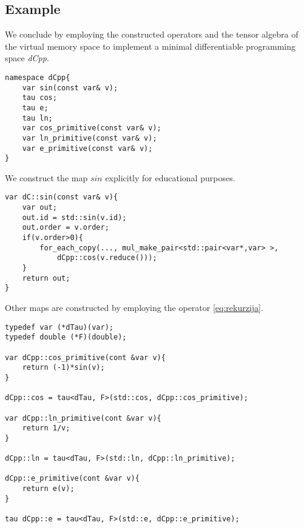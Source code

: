 \subsection{Example}

We conclude by employing the constructed operators and the tensor algebra of the virtual memory space to implement a minimal differentiable programming space \emph{dCpp}.

\begin{lstlisting}
namespace dCpp{
    var sin(const var& v);
    tau cos;
    tau e;
    tau ln;
    var cos_primitive(const var& v);
    var ln_primitive(const var& v);
    var e_primitive(const var& v);
}
\end{lstlisting}

\noindent We construct the map $sin$ explicitly for educational purposes.

\begin{lstlisting}
var dC::sin(const var& v){
    var out;
    out.id = std::sin(v.id);
    out.order = v.order;
    if(v.order>0){
    	for_each_copy(..., mul_make_pair<std::pair<var*,var> >,
    		dCpp::cos(v.reduce()));
    }
    return out;
}
\end{lstlisting}
Other maps are constructed by employing the operator \eqref{eq:rekurzija}.
\begin{lstlisting}
typedef var (*dTau)(var);
typedef double (*F)(double);

var dCpp::cos_primitive(cont &var v){
    return (-1)*sin(v);
}

dCpp::cos = tau<dTau, F>(std::cos, dCpp::cos_primitive);

var dCpp::ln_primitive(cont &var v){
    return 1/v;
}

dCpp::ln = tau<dTau, F>(std::ln, dCpp::ln_primitive);

dCpp::e_primitive(cont &var v){
    return e(v);
}

tau dCpp::e = tau<dTau, F>(std::e, dCpp::e_primitive);

\end{lstlisting}

